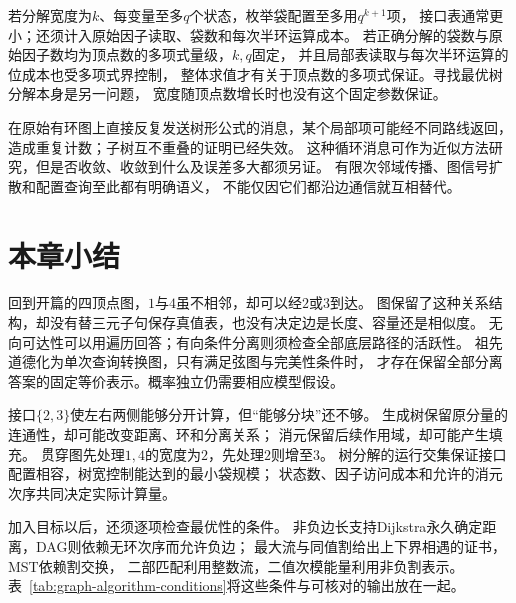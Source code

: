 若分解宽度为\(k\)、每变量至多\(q\)个状态，枚举袋配置至多用\(q^{k+1}\)项，
接口表通常更小；还须计入原始因子读取、袋数和每次半环运算成本。
若正确分解的袋数与原始因子数均为顶点数的多项式量级，\(k,q\)固定，
并且局部表读取与每次半环运算的位成本也受多项式界控制，
整体求值才有关于顶点数的多项式保证。寻找最优树分解本身是另一问题，
宽度随顶点数增长时也没有这个固定参数保证。

在原始有环图上直接反复发送树形公式的消息，某个局部项可能经不同路线返回，
造成重复计数；子树互不重叠的证明已经失效。
这种循环消息可作为近似方法研究，但是否收敛、收敛到什么及误差多大都须另证。
有限次邻域传播、图信号扩散和配置查询至此都有明确语义，
不能仅因它们都沿边通信就互相替代。

\section{本章小结}
\label{sec:graph-theory-summary}

回到开篇的四顶点图，\(1\)与\(4\)虽不相邻，却可以经\(2\)或\(3\)到达。
图保留了这种关系结构，却没有替三元子句保存真值表，也没有决定边是长度、容量还是相似度。
无向可达性可以用遍历回答；有向条件分离则须检查全部底层路径的活跃性。
祖先道德化为单次查询转换图，只有满足弦图与完美性条件时，
才存在保留全部分离答案的固定等价表示。概率独立仍需要相应模型假设。

接口\(\{2,3\}\)使左右两侧能够分开计算，但“能够分块”还不够。
生成树保留原分量的连通性，却可能改变距离、环和分离关系；
消元保留后续作用域，却可能产生填充。
贯穿图先处理\(1,4\)的宽度为\(2\)，先处理\(2\)则增至\(3\)。
树分解的运行交集保证接口配置相容，树宽控制能达到的最小袋规模；
状态数、因子访问成本和允许的消元次序共同决定实际计算量。

加入目标以后，还须逐项检查最优性的条件。
非负边长支持Dijkstra永久确定距离，DAG则依赖无环次序而允许负边；
最大流与同值割给出上下界相遇的证书，MST依赖割交换，
二部匹配利用整数流，二值次模能量利用非负割表示。
表~\ref{tab:graph-algorithm-conditions}将这些条件与可核对的输出放在一起。

